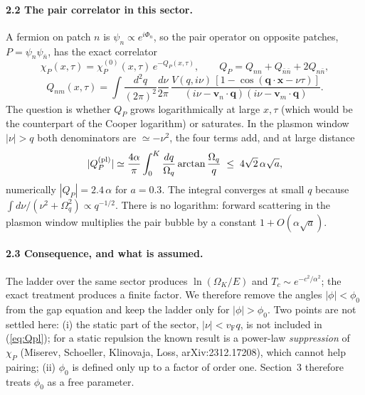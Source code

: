 \documentclass[11pt]{article}
\newcommand{\vF}{v_{\mathrm F}}
\newcommand{\OK}{\Omega_K}
\begin{document}
\paragraph{2.2 The pair correlator in this sector.}
A fermion on patch $n$ is $\psi_n\propto e^{i\Phi_n}$, so the pair operator on opposite
patches, $P=\psi_n\psi_{\bar n}$, has the exact correlator
\begin{equation}
\chi_P(x,\tau)=\chi_P^{(0)}(x,\tau)\,e^{-Q_P(x,\tau)},\qquad
Q_P=Q_{nn}+Q_{\bar n\bar n}+2Q_{n\bar n},
\label{eq:DW}
\end{equation}
\begin{equation}
Q_{nm}(x,\tau)=\int\!\frac{d^2q}{(2\pi)^2}\frac{d\nu}{2\pi}\,
\frac{V(q,i\nu)\,[1-\cos(\mathbf q\cdot\mathbf x-\nu\tau)]}
{(i\nu-\mathbf v_n\!\cdot\!\mathbf q)(i\nu-\mathbf v_m\!\cdot\!\mathbf q)} .
\label{eq:Qnm}
\end{equation}
The question is whether $Q_P$ grows logarithmically at large $x,\tau$ (which would be the
counterpart of the Cooper logarithm) or saturates. In the plasmon window $|\nu|>q$ both
denominators are $\simeq-\nu^2$, the four terms add, and at large distance
\begin{equation}
|Q_P^{\rm (pl)}|\simeq\frac{4\alpha}{\pi}\int_0^{K}\frac{dq}{\Omega_q}
\arctan\frac{\Omega_q}{q}\;\le\;4\sqrt2\,\alpha\sqrt a ,
\label{eq:Qpl}
\end{equation}
numerically $|Q_P|=2.4\,\alpha$ for $a=0.3$. The integral converges at small $q$ because
$\int d\nu/(\nu^2+\Omega_q^2)\propto q^{-1/2}$. There is no logarithm: forward scattering in
the plasmon window multiplies the pair bubble by a constant $1+O(\alpha\sqrt a)$.

\paragraph{2.3 Consequence, and what is assumed.}
The ladder over the same sector produces $\ln(\OK/E)$ and $T_c\sim e^{-c^2/\alpha^2}$; the
exact treatment produces a finite factor. We therefore remove the angles $|\phi|<\phi_0$
from the gap equation and keep the ladder only for $|\phi|>\phi_0$. Two points are not
settled here: (i) the static part of the sector, $|\nu|<\vF q$, is not included in
(\ref{eq:Qpl}); for a static repulsion the known result is a power-law \emph{suppression}
of $\chi_P$ (Miserev, Schoeller, Klinovaja, Loss, arXiv:2312.17208), which cannot help
pairing; (ii) $\phi_0$ is defined only up to a factor of order one. Section~3 therefore
treats $\phi_0$ as a free parameter.
\end{document}
